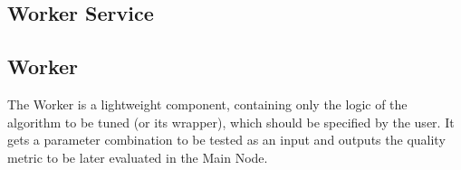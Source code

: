 \subsection{Worker Service}


\subsection{Worker}

The Worker is a lightweight component, containing only the logic of the algorithm to be tuned (or its wrapper), which should be specified by the user. It gets a parameter combination to be tested as an input and outputs the quality metric to be later evaluated in the Main Node. 








